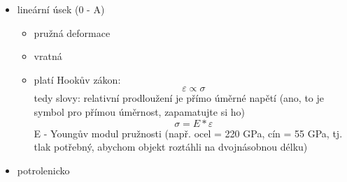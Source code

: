 \documentclass{article}
\begin{document}
      \begin{itemize}
        \item lineární úsek (0 - A)
        \begin{itemize}
          \item pružná deformace
          \item vratná
          \item platí Hookův zákon:
            \begin{equation}
              \varepsilon \propto \sigma
              \end{equation}
          tedy slovy: relativní prodloužení je přímo úměrné napětí (ano, to je symbol pro přímou úměrnost, zapamatujte si ho)
            \begin{equation}
              \sigma = E*\varepsilon
            \end{equation}
          E - Youngův modul pružnosti (např. ocel = 220 GPa, cín = 55 GPa, tj. tlak potřebný, abychom objekt roztáhli na dvojnásobnou délku)
        \end{itemize}
        \item potrolenicko
      \end{itemize}
\end{document}
